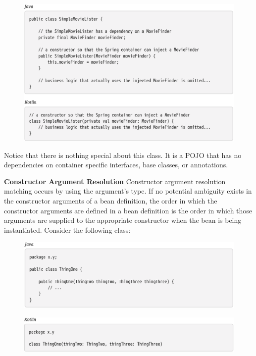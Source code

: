 \begin{figure}[ht]
    \centering
    \includegraphics[width=1\linewidth]{./Figure/IMG_code_21.png}
\end{figure}

Notice that there is nothing special about this class. It is a POJO that has no dependencies on
container specific interfaces, base classes, or annotations.

\newpage
\textbf{Constructor Argument Resolution} Constructor argument resolution matching occurs by using the argument’s type. If no potential
ambiguity exists in the constructor arguments of a bean definition, the order in which the
constructor arguments are defined in a bean definition is the order in which those arguments are
supplied to the appropriate constructor when the bean is being instantiated. Consider the following
class:

\begin{figure}[ht]
    \centering
    \includegraphics[width=1\linewidth]{./Figure/IMG_code_22.png}
\end{figure}
\begin{figure}[ht]
    \centering
    \includegraphics[width=1\linewidth]{./Figure/IMG_code_23.png}
\end{figure}

